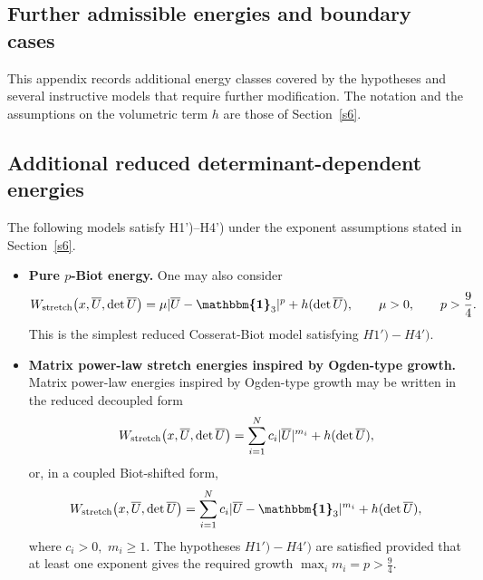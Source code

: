 \documentclass[11pt]{article}
\newcommand{\id}{{\boldsymbol{\mathbbm{1}}}}
\begin{document}
\begin{footnotesize}
\appendix
\section{Further admissible energies and boundary cases}\label{app:further-examples}\setcounter{equation}{0}

This appendix records additional energy classes covered by the hypotheses and several instructive models that require further modification. The notation and the assumptions on the volumetric term $h$ are those of Section~\ref{s6}.

\subsection{Additional reduced determinant-dependent energies}

The following models satisfy H1')--H4') under the exponent assumptions stated in Section~\ref{s6}.

\begin{itemize}

\item \textbf{Pure $p$-Biot energy.}
One may also consider
\begin{align}
        W_{\rm stretch}\bigl(x,\overline U,\det \overline U\bigr)
        =
        \mu  | \overline U-\id_3 | ^p
        +
        h(\det \overline U),
        \qquad
        \mu>0,
        \qquad
        p>\frac{9}{4}.
\end{align}
This is the simplest reduced Cosserat-Biot model satisfying $H1')-H4')$.

\item \textbf{Matrix power-law stretch energies inspired by Ogden-type growth.}
Matrix power-law energies inspired by Ogden-type growth may be written
in the reduced decoupled form
\begin{align}
        W_{\rm stretch}\bigl(x,\overline U,\det \overline U\bigr)
        =
        \sum_{i=1}^N c_i  | \overline  U | ^{m_i}
        +
        h(\det \overline U),
\end{align}
or, in a coupled Biot-shifted form,
\begin{align}
        W_{\rm stretch}\bigl(x,\overline U,\det \overline U\bigr)
        =
        \sum_{i=1}^N c_i  | \overline U-\id_3 | ^{m_i}
        +
        h(\det \overline U),
\end{align}
where
$
        c_i>0,
$ $
        m_i\geq1.
$
The hypotheses $H1')-H4')$ are satisfied provided that at least one exponent
gives the required growth
$
        \max_i m_i=p>\frac{9}{4}.
$


\end{itemize}
\end{footnotesize}
\end{document}
